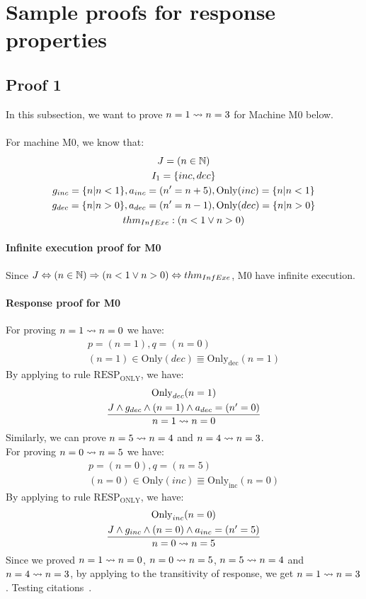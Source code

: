 
\section{Sample proofs for response properties}
\label{sec:results}
\subsection{Proof  1}
In this subsection, we want to prove $n=1\rightsquigarrow{{n}=3}$ for Machine M0 below.\\
\\
For machine M0, we know that:
\begin{gather*}
J = (n\in\mathbb{N})\\ 
I_1 = \{inc,dec\}\\
g_{inc} = \{n | n < 1\}, a_{inc} = (n' = n + 5), \mathrm{Only}({inc}) = \{n | n < 1\}\\
g_{dec} = \{n | n > 0\}, a_{dec} = (n' = n - 1), \mathrm{Only}({dec}) = \{n | n > 0\}\\
thm_{InfExe} : (n < 1\vee{n} > 0) 
\end{gather*} 
\paragraph{Infinite execution proof for M0}
Since ${J}\Leftrightarrow(n\in\mathbb{N})\Rightarrow(n < 1\vee{n} > 0)\Leftrightarrow{thm_{InfExe}}$, $\mathrm{M0}$ have infinite execution.
\paragraph{Response proof for M0}
For proving $n = 1\rightsquigarrow{n = 0}$ we have:
\begin{gather*}
   p = (n = 1), q = (n = 0)\\   
   (n = 1)\in\mathrm{Only}({dec})\Equiv\mathrm{Only_{dec}}(n = 1)
\end{gather*}
By applying to rule \texttt{$\mathrm{RESP_{ONLY}}$}, we have:
\begin{gather*}
  \mathrm{Only}_{dec}({n = 1})\\
  \frac{{J}\wedge{g_{dec}}\wedge{(n = 1)}\wedge{a_{dec}} = (n' = 0)}{n = 1\rightsquigarrow{n = 0}}
\end{gather*}
Similarly, we can prove ${n = 5\rightsquigarrow{n = 4}}$ and ${n = 4\rightsquigarrow{n = 3}}$.\\
For proving $n = 0\rightsquigarrow{n = 5}$ we have:
\begin{gather*}
   p = (n = 0), q = (n = 5)\\   
   (n = 0)\in\mathrm{Only}({inc})\Equiv\mathrm{Only_{inc}}(n = 0)
\end{gather*}
By applying to rule \texttt{$\mathrm{RESP_{ONLY}}$}, we have:
\begin{gather*}
  \mathrm{Only}_{inc}({n = 0})\\
  \frac{{J}\wedge{g_{inc}}\wedge{(n = 0)}\wedge{a_{inc}} = (n' = 5)}{n = 0\rightsquigarrow{n = 5}}
\end{gather*}
Since we proved ${n = 1\rightsquigarrow{n = 0}}$, ${n = 0\rightsquigarrow{n = 5}}$, ${n = 5\rightsquigarrow{n = 4}}$ and ${n = 4\rightsquigarrow{n = 3}}$, by applying to the transitivity of response, we get $n=1\rightsquigarrow{{n}=3}$.
Testing citations~\cite{Engelhardt2013, MannaPnueli1991:szym,
  HoangAbrial:ICFEM2011, MannaPnueli92, MannaPnueli:REX1988}.

